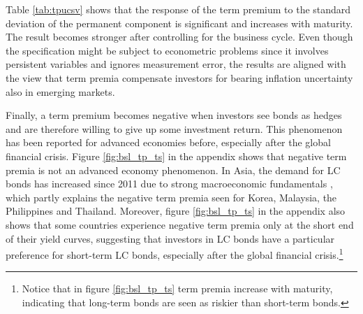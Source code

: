 {Table \ref{tab:tpucsv} shows that the response of the term premium to the standard deviation of the permanent component is significant %
and increases with maturity.
The result becomes stronger after controlling for the business cycle. 
Even though the specification might be subject to econometric problems since it involves persistent variables and ignores measurement error,
the results are %
aligned with the view that term premia compensate investors for bearing inflation uncertainty also in emerging markets.




Finally, a term premium becomes negative when investors see bonds as hedges and are therefore willing to give up some investment return. 
This phenomenon has been reported for advanced economies before, especially after the global financial crisis.
Figure \ref{fig:bsl_tp_ts} in the appendix shows that negative term premia is not an advanced economy phenomenon.
In Asia, the demand for LC bonds has increased since 2011 due to strong macroeconomic fundamentals \citep{IMFWB:2020}, which partly explains the negative term premia seen for Korea, Malaysia, the Philippines and Thailand.
Moreover,
figure \ref{fig:bsl_tp_ts} in the appendix also shows that some countries experience negative term premia only at the short end of their yield curves, %
suggesting that %
investors in LC bonds %
have a particular preference for short-term LC bonds, especially after the global financial crisis.\footnote{ Notice that in figure \ref{fig:bsl_tp_ts} term premia increase with maturity, indicating that long-term bonds are seen as riskier than short-term bonds.}

}
